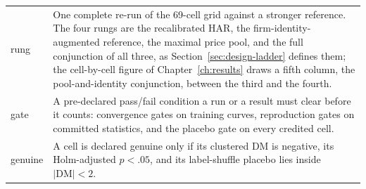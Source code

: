 {\begin{tabular}{@{}>{\raggedright\arraybackslash}p{}>{\raggedright\arraybackslash}p{}@{}}
rung & One complete re-run of the 69-cell grid against a stronger reference. The four rungs are the recalibrated HAR, the firm-identity-augmented reference, the maximal price pool, and the full conjunction of all three, as Section~\ref{sec:design-ladder} defines them; the cell-by-cell figure of Chapter~\ref{ch:results} draws a fifth column, the pool-and-identity conjunction, between the third and the fourth. \\
gate & A pre-declared pass/fail condition a run or a result must clear before it counts: convergence gates on training curves, reproduction gates on committed statistics, and the placebo gate on every credited cell. \\
genuine & A cell is declared genuine only if its clustered DM is negative, its Holm-adjusted $p < .05$, and its label-shuffle placebo lies inside $|\mathrm{DM}| < 2$. \\
\bottomrule
\end{tabular}\par
}
